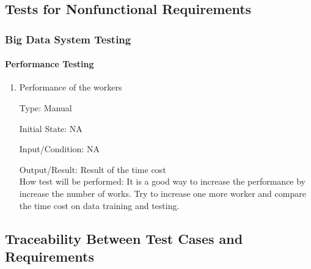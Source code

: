 \documentclass[12pt, titlepage]{article}
\begin{document}
\subsection{Tests for Nonfunctional Requirements}

\subsubsection{Big Data System Testing}
		
\paragraph{ Performance Testing}

\begin{enumerate}

\item{Performance of the workers\\}

Type: Manual
					
Initial State: NA
					
Input/Condition: NA
					
Output/Result: Result of the time cost\\
					
How test will be performed: It is a good way to increase the performance by increase the number of works. Try to increase one more worker and compare the time cost on data training and testing.
					


\end{enumerate}


\subsection{Traceability Between Test Cases and Requirements}


		
\end{document}
